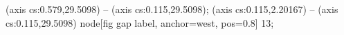  (axis cs:0.579,29.5098) -- (axis cs:0.115,29.5098);
 (axis cs:0.115,2.20167) -- (axis cs:0.115,29.5098)
  node[fig gap label, anchor=west, pos=0.8] {\texttimes{}13};
